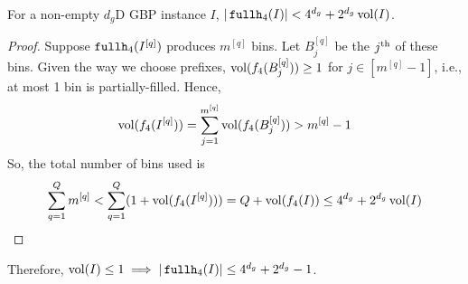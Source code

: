 \begin{lemma}
\label{lem:fh4}
For a non-empty $d_g$D GBP instance $I$, $|\fhk[4](I)| < 4^{d_g} + 2^{d_g}\vol(I)$.
\end{lemma}
\begin{proof}
Suppose $\fhk[4](I^{[q]})$ produces $m^{[q]}$ bins. Let $B_j^{[q]}$ be the $j\Th$ of these bins.
Given the way we choose prefixes, $\vol(f_4(B_j^{[q]})) \ge 1$ for $j \in [m^{[q]}-1]$,
i.e., at most 1 bin is partially-filled. Hence,
\[ \vol(f_4(I^{[q]})) = \sum_{j=1}^{m^{[q]}} \vol(f_4(B_j^{[q]})) > m^{[q]}-1 \]
So, the total number of bins used is
\[ \sum_{q=1}^Q m^{[q]} < \sum_{q=1}^Q (1 + \vol(f_4(I^{[q]})))
= Q + \vol(f_4(I)) \le 4^{d_g} + 2^{d_g}\vol(I) \qedhere \]
\end{proof}

Therefore, $\vol(I) \le 1 \implies |\fhk[4](I)| \le 4^{d_g} + 2^{d_g} - 1$.
